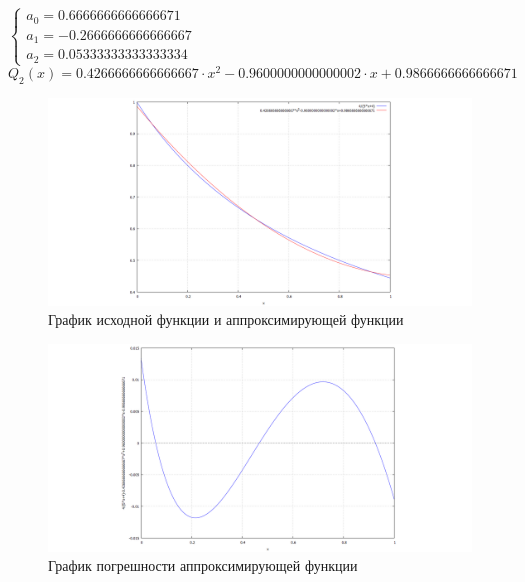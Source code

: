 $
 \begin{cases}
  a_0 = 0.6666666666666671
\\
  a_1 = -0.2666666666666667
\\
  a_2 = 0.05333333333333334
 \end{cases}
$\\[1mm]

\begin{displaymath}
Q_2(x) = 0.4266666666666667 \cdot x^2 - 0.9600000000000002 \cdot x + 0.9866666666666671
\end{displaymath}

\begin{figure}[H]
	\begin{center}
		\includegraphics[width=19cm]{chebyshev.png}
		\caption{График исходной функции и аппроксимирующей функции} 
		\label{pic:2:4:1}
	\end{center}
\end{figure}

\begin{figure}[H]
	\begin{center}
		\includegraphics[width=19cm]{e_chebyshev.png}
		\caption{График погрешности аппроксимирующей функции} 
		\label{pic:2:4:2}
	\end{center}
\end{figure}


